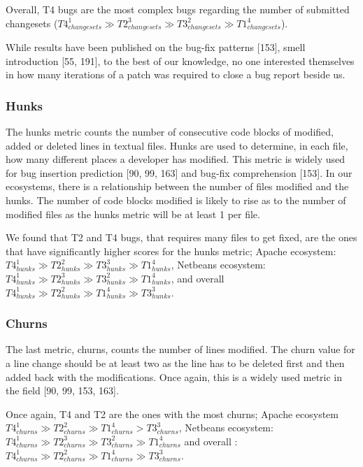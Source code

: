 \documentclass[12pt]{report}
\begin{document}
Overall, T4 bugs are the most complex bugs regarding the number of
submitted changesets
(\(T4_{changesets}^1 \gg T2_{changesets}^3 \gg T3_{changesets}^2 \gg T1_{changesets}^4\)).

While results have been published on the bug-fix patterns {[}153{]},
smell introduction {[}55, 191{]}, to the best of our knowledge, no one
interested themselves in how many iterations of a patch was required to
close a bug report beside us.

\subsubsection{Hunks}\label{hunks}

The hunks metric counts the number of consecutive code blocks of
modified, added or deleted lines in textual files. Hunks are used to
determine, in each file, how many different places a developer has
modified. This metric is widely used for bug insertion prediction {[}90,
99, 163{]} and bug-fix comprehension {[}153{]}. In our ecosystems, there
is a relationship between the number of files modified and the hunks.
The number of code blocks modified is likely to rise as to the number of
modified files as the hunks metric will be at least 1 per file.

We found that T2 and T4 bugs, that requires many files to get fixed, are
the ones that have significantly higher scores for the hunks metric;
Apache ecosystem:
\(T4_{hunks}^1 \gg T2_{hunks}^2 \gg T3_{hunks}^3 \gg T1_{hunks}^4\),
Netbeans ecosystem:
\(T4_{hunks}^1 \gg T2_{hunks}^3 \gg T3_{hunks}^2 \gg T1_{hunks}^4\), and
overall
\(T4_{hunks}^1 \gg T2_{hunks}^2 \gg T1_{hunks}^4 \gg T3_{hunks}^3\).

\subsubsection{Churns}\label{churns}

The last metric, churns, counts the number of lines modified. The churn
value for a line change should be at least two as the line has to be
deleted first and then added back with the modifications. Once again,
this is a widely used metric in the field {[}90, 99, 153, 163{]}.

Once again, T4 and T2 are the ones with the most churns; Apache
ecosystem
\(T4_{churns}^1 \gg T2_{churns}^2 \gg T1_{churns}^4 > T3_{churns}^3\),
Netbeans ecosystem:
\(T4_{churns}^1 \gg T2_{churns}^3 \gg T3_{churns}^2 \gg T1_{churns}^4\)
and overall :
\(T4_{churns}^1 \gg T2_{churns}^2 \gg T1_{churns}^4 \gg T3_{churns}^3\).
\end{document}
